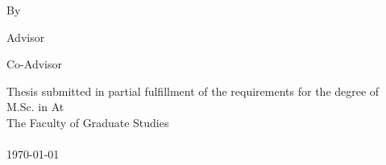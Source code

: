 \documentclass[
11pt, %
oneside, %
english, %
onehalfspacing, %
liststotoc, %
toctotoc, %
parskip, %
]{MastersDoctoralThesis} %
\author{Student Full Name} %
\begin{document}
\large
\pagestyle{plain} %

\begin{titlepage}
\begin{center}
\hspace{0pt}
\vfill
{\LARGE \bfseries \MakeUppercase \ttitle\par}
\vfill
\hspace{0pt}
\end{center}
\end{titlepage}
\newpage
\begin{center}
\vspace*{2.5cm}
{\Large \bfseries \MakeUppercase \ttitle\par}\vspace{2cm}
{\Large By}\\[.3cm]
{\Large \bfseries \authorname\par}\vspace{1cm}
{\Large Advisor}\\[.1cm]
{\Large \bfseries \supname\par}\vspace{1cm}
{\Large Co-Advisor}\\[.1cm]
{\Large \bfseries \coname\par}\vspace{1cm}
\vfill
\Large{Thesis submitted in partial fulfillment of the requirements for the degree of\\ M.Sc. in \subjectname}
\vfill
\Large{At}\\[0.4cm]
\Large{The Faculty of Graduate Studies \\\univname}\\[2cm] 
\vfill
{\Large \monthyeardate\today}\\[4cm]
\vfill
\end{center}
\end{document}
